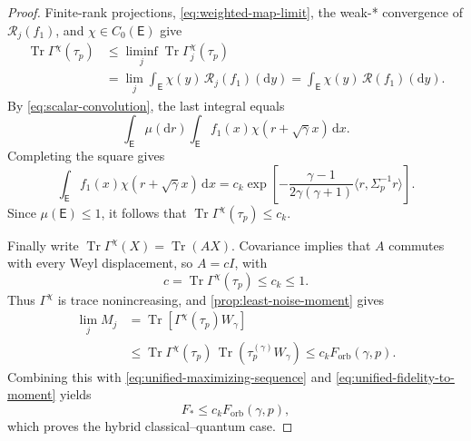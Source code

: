 \documentclass[11pt]{article}
\theoremstyle{remark}
\theoremstyle{plain}
\newcommand{\dd}{\mathrm d}
\newcommand{\Tr}{\operatorname{Tr}}
\newcommand{\Forb}{F_{\mathrm{orb}}}
\begin{document}
\begin{proof}
Finite-rank projections, \eqref{eq:weighted-map-limit}, the weak-*
convergence of \(\mathcal R_j(f_1)\), and
\(\chi\in C_0(\mathsf E)\) give
\[
\begin{aligned}
  \Tr\Gamma^\chi(\tau_p)
  &\le\liminf_j\Tr\Gamma_j^\chi(\tau_p)\\
  &=\lim_j\int_{\mathsf E}\chi(y)\,\mathcal R_j(f_1)(\dd y)
   =\int_{\mathsf E}\chi(y)\,\mathcal R(f_1)(\dd y).
\end{aligned}
\]
By \eqref{eq:scalar-convolution}, the last integral equals
\[
  \int_{\mathsf E}\mu(\dd r)
  \int_{\mathsf E}f_1(x)\chi(r+\sqrt\gamma x)\,\dd x.
\]
Completing the square gives
\[
  \int_{\mathsf E}f_1(x)\chi(r+\sqrt\gamma x)\,\dd x
  =c_k\exp\!\left[-\frac{\gamma-1}{2\gamma(\gamma+1)}
    \langle r,\Sigma_p^{-1}r\rangle\right].
\]
Since \(\mu(\mathsf E)\le1\), it follows that
\(\Tr\Gamma^\chi(\tau_p)\le c_k\).

Finally write \(\Tr\Gamma^\chi(X)=\Tr(AX)\).  Covariance implies that \(A\)
commutes with every Weyl displacement, so \(A=cI\), with
\[
  c=\Tr\Gamma^\chi(\tau_p)\le c_k\le1.
\]
Thus \(\Gamma^\chi\) is trace nonincreasing, and
\cref{prop:least-noise-moment} gives
\[
\begin{aligned}
  \lim_j M_j
  &=\Tr[\Gamma^\chi(\tau_p)W_\gamma]\\
  &\le\Tr\Gamma^\chi(\tau_p)\,
       \Tr(\tau_p^{(\gamma)}W_\gamma)
  \le c_k\Forb(\gamma,p).
\end{aligned}
\]
Combining this with \eqref{eq:unified-maximizing-sequence} and
\eqref{eq:unified-fidelity-to-moment} yields
\[
  F_*\le c_k\Forb(\gamma,p),
\]
which proves the hybrid classical--quantum case.
\end{proof}
\end{document}
